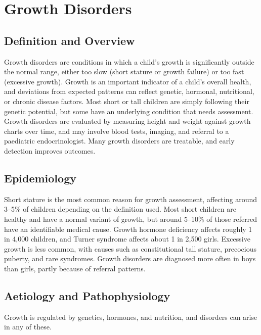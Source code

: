 \chapter{Growth Disorders}

\section*{Definition and Overview}
Growth disorders are conditions in which a child's growth is significantly outside the normal range, either too slow (short stature or growth failure) or too fast (excessive growth). Growth is an important indicator of a child's overall health, and deviations from expected patterns can reflect genetic, hormonal, nutritional, or chronic disease factors. Most short or tall children are simply following their genetic potential, but some have an underlying condition that needs assessment. Growth disorders are evaluated by measuring height and weight against growth charts over time, and may involve blood tests, imaging, and referral to a paediatric endocrinologist. Many growth disorders are treatable, and early detection improves outcomes.

\section*{Epidemiology}
Short stature is the most common reason for growth assessment, affecting around 3--5\% of children depending on the definition used. Most short children are healthy and have a normal variant of growth, but around 5--10\% of those referred have an identifiable medical cause. Growth hormone deficiency affects roughly 1 in 4,000 children, and Turner syndrome affects about 1 in 2,500 girls. Excessive growth is less common, with causes such as constitutional tall stature, precocious puberty, and rare syndromes. Growth disorders are diagnosed more often in boys than girls, partly because of referral patterns.

\section*{Aetiology and Pathophysiology}
Growth is regulated by genetics, hormones, and nutrition, and disorders can arise in any of these.

